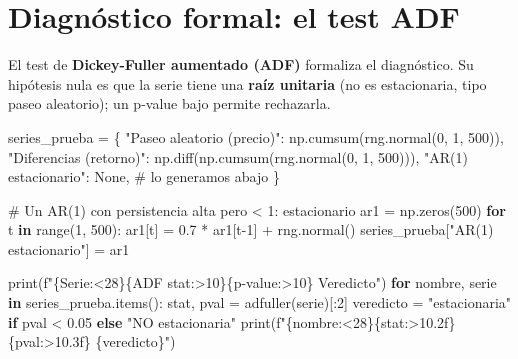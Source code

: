 \documentclass[
  spanish,
  letterpaper,
  DIV=11,
  numbers=noendperiod]{scrreprt}
\newenvironment{Shaded}{\begin{snugshade}}{\end{snugshade}}
\newcommand{\BuiltInTok}[1]{\textcolor[rgb]{0.00,0.23,0.31}{#1}}
\newcommand{\CommentTok}[1]{\textcolor[rgb]{0.37,0.37,0.37}{#1}}
\newcommand{\ControlFlowTok}[1]{\textcolor[rgb]{0.00,0.23,0.31}{\textbf{#1}}}
\newcommand{\DecValTok}[1]{\textcolor[rgb]{0.68,0.00,0.00}{#1}}
\newcommand{\FloatTok}[1]{\textcolor[rgb]{0.68,0.00,0.00}{#1}}
\newcommand{\KeywordTok}[1]{\textcolor[rgb]{0.00,0.23,0.31}{\textbf{#1}}}
\newcommand{\NormalTok}[1]{\textcolor[rgb]{0.00,0.23,0.31}{#1}}
\newcommand{\OperatorTok}[1]{\textcolor[rgb]{0.37,0.37,0.37}{#1}}
\newcommand{\SpecialCharTok}[1]{\textcolor[rgb]{0.37,0.37,0.37}{#1}}
\newcommand{\SpecialStringTok}[1]{\textcolor[rgb]{0.13,0.47,0.30}{#1}}
\newcommand{\StringTok}[1]{\textcolor[rgb]{0.13,0.47,0.30}{#1}}
\newcommand{\VariableTok}[1]{\textcolor[rgb]{0.07,0.07,0.07}{#1}}
\begin{document}
\section{Diagnóstico formal: el test
ADF}\label{diagnuxf3stico-formal-el-test-adf}

El test de \textbf{Dickey-Fuller aumentado (ADF)} formaliza el
diagnóstico. Su hipótesis nula es que la serie tiene una \textbf{raíz
unitaria} (no es estacionaria, tipo paseo aleatorio); un p-value bajo
permite rechazarla.

\label{adf}
\begin{Shaded}
\begin{Highlighting}[]
\NormalTok{series\_prueba }\OperatorTok{=}\NormalTok{ \{}
    \StringTok{"Paseo aleatorio (precio)"}\NormalTok{: np.cumsum(rng.normal(}\DecValTok{0}\NormalTok{, }\DecValTok{1}\NormalTok{, }\DecValTok{500}\NormalTok{)),}
    \StringTok{"Diferencias (retorno)"}\NormalTok{: np.diff(np.cumsum(rng.normal(}\DecValTok{0}\NormalTok{, }\DecValTok{1}\NormalTok{, }\DecValTok{500}\NormalTok{))),}
    \StringTok{"AR(1) estacionario"}\NormalTok{: }\VariableTok{None}\NormalTok{,  }\CommentTok{\# lo generamos abajo}
\NormalTok{\}}

\CommentTok{\# Un AR(1) con persistencia alta pero \textless{} 1: estacionario}
\NormalTok{ar1 }\OperatorTok{=}\NormalTok{ np.zeros(}\DecValTok{500}\NormalTok{)}
\ControlFlowTok{for}\NormalTok{ t }\KeywordTok{in} \BuiltInTok{range}\NormalTok{(}\DecValTok{1}\NormalTok{, }\DecValTok{500}\NormalTok{):}
\NormalTok{    ar1[t] }\OperatorTok{=} \FloatTok{0.7} \OperatorTok{*}\NormalTok{ ar1[t}\OperatorTok{{-}}\DecValTok{1}\NormalTok{] }\OperatorTok{+}\NormalTok{ rng.normal()}
\NormalTok{series\_prueba[}\StringTok{"AR(1) estacionario"}\NormalTok{] }\OperatorTok{=}\NormalTok{ ar1}

\BuiltInTok{print}\NormalTok{(}\SpecialStringTok{f"}\SpecialCharTok{\{}\StringTok{\textquotesingle{}Serie\textquotesingle{}}\SpecialCharTok{:\textless{}28\}\{}\StringTok{\textquotesingle{}ADF stat\textquotesingle{}}\SpecialCharTok{:\textgreater{}10\}\{}\StringTok{\textquotesingle{}p{-}value\textquotesingle{}}\SpecialCharTok{:\textgreater{}10\}}\SpecialStringTok{   Veredicto"}\NormalTok{)}
\ControlFlowTok{for}\NormalTok{ nombre, serie }\KeywordTok{in}\NormalTok{ series\_prueba.items():}
\NormalTok{    stat, pval }\OperatorTok{=}\NormalTok{ adfuller(serie)[:}\DecValTok{2}\NormalTok{]}
\NormalTok{    veredicto }\OperatorTok{=} \StringTok{"estacionaria"} \ControlFlowTok{if}\NormalTok{ pval }\OperatorTok{\textless{}} \FloatTok{0.05} \ControlFlowTok{else} \StringTok{"NO estacionaria"}
    \BuiltInTok{print}\NormalTok{(}\SpecialStringTok{f"}\SpecialCharTok{\{}\NormalTok{nombre}\SpecialCharTok{:\textless{}28\}\{}\NormalTok{stat}\SpecialCharTok{:\textgreater{}10.2f\}\{}\NormalTok{pval}\SpecialCharTok{:\textgreater{}10.3f\}}\SpecialStringTok{   }\SpecialCharTok{\{}\NormalTok{veredicto}\SpecialCharTok{\}}\SpecialStringTok{"}\NormalTok{)}
\end{Highlighting}
\end{Shaded}
\end{document}
